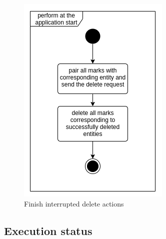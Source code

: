 \begin{figure}
\begin{minipage}[b]{0.45\textwidth}
    	\includegraphics[width=\textwidth]{pics/undo/db_clean.png}
    	\caption[Finish interrupted delete actions]{Finish interrupted delete actions}\label{fig:undoDbClean}
    \end{minipage}
\end{figure}

\subsection{Execution status}
